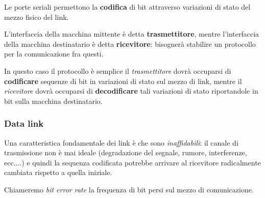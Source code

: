 \documentclass[a4paper,11pt]{article}
\begin{document}
Le porte seriali permettono la \textbf{codifica} di bit attraverso variazioni di stato del mezzo fisico del link.

L'interfaccia della macchina mittente è detta \textbf{trasmettitore}, mentre l'interfaccia della macchina destinatario è detta \textbf{ricevitore}: bisognerà stabilire un protocollo per la comunicazione fra questi.

In questo caso il protocollo è semplice il \textit{trasmettitore} dovrà occuparsi di \textbf{codificare} sequenze di bit in variazioni di stato sul mezzo di link, mentre il \textit{ricevitore} dovrà occuparsi di \textbf{decodificare} tali variazioni di stato riportandole in bit sulla macchina destinatario.

\subsubsection{Data link}
Una caratteristica fondamentale dei link è che sono \textit{inaffidabili}: il canale di trasmissione non è mai ideale (degradazione del segnale, rumore, interferenze, ecc....) e quindi la sequenza codificata potrebbe arrivare al ricevitore radicalmente cambiata rispetto a quella iniziale.

Chiameremo \textit{bit error rate} la frequenza di bit persi sul mezzo di comunicazione. 
\end{document}
